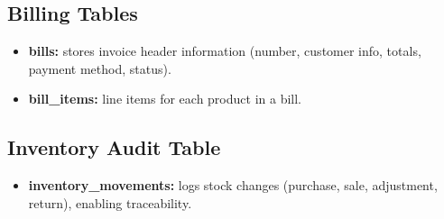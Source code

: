 \documentclass[12pt,a4paper]{report}
\begin{document}
\subsection{Billing Tables}
\begin{itemize}
  \item \textbf{bills:} stores invoice header information (number, customer info, totals, payment method, status).
  \item \textbf{bill\_items:} line items for each product in a bill.
\end{itemize}

\subsection{Inventory Audit Table}
\begin{itemize}
  \item \textbf{inventory\_movements:} logs stock changes (purchase, sale, adjustment, return), enabling traceability.
\end{itemize}
\end{document}
